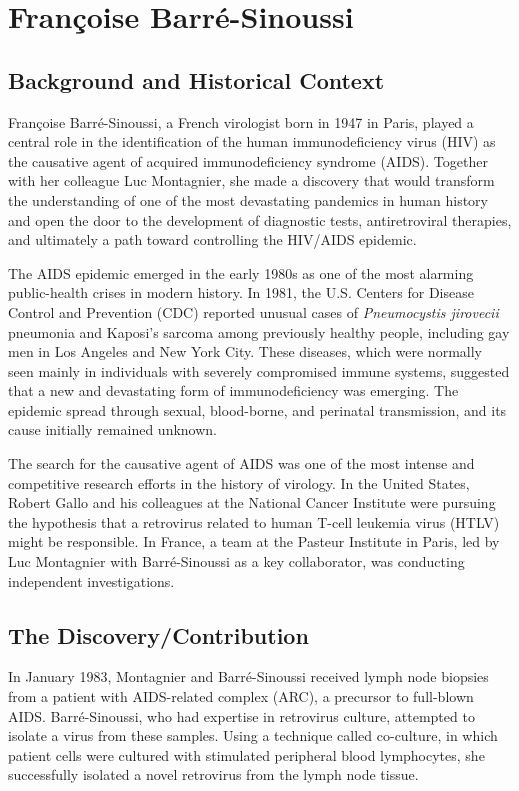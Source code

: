 \section{Fran\c{c}oise Barr\'e-Sinoussi}

\subsection{Background and Historical Context}

Fran\c{c}oise Barr\'e-Sinoussi, a French virologist born in 1947 in Paris, played a central role in the identification of the human immunodeficiency virus (HIV) as the causative agent of acquired immunodeficiency syndrome (AIDS). Together with her colleague Luc Montagnier, she made a discovery that would transform the understanding of one of the most devastating pandemics in human history and open the door to the development of diagnostic tests, antiretroviral therapies, and ultimately a path toward controlling the HIV/AIDS epidemic.

The AIDS epidemic emerged in the early 1980s as one of the most alarming public-health crises in modern history. In 1981, the U.S. Centers for Disease Control and Prevention (CDC) reported unusual cases of \textit{Pneumocystis jirovecii} pneumonia and Kaposi's sarcoma among previously healthy people, including gay men in Los Angeles and New York City. These diseases, which were normally seen mainly in individuals with severely compromised immune systems, suggested that a new and devastating form of immunodeficiency was emerging. The epidemic spread through sexual, blood-borne, and perinatal transmission, and its cause initially remained unknown.

The search for the causative agent of AIDS was one of the most intense and competitive research efforts in the history of virology. In the United States, Robert Gallo and his colleagues at the National Cancer Institute were pursuing the hypothesis that a retrovirus related to human T-cell leukemia virus (HTLV) might be responsible. In France, a team at the Pasteur Institute in Paris, led by Luc Montagnier with Barr\'e-Sinoussi as a key collaborator, was conducting independent investigations.

\subsection{The Discovery/Contribution}

In January 1983, Montagnier and Barr\'e-Sinoussi received lymph node biopsies from a patient with AIDS-related complex (ARC), a precursor to full-blown AIDS. Barr\'e-Sinoussi, who had expertise in retrovirus culture, attempted to isolate a virus from these samples. Using a technique called co-culture, in which patient cells were cultured with stimulated peripheral blood lymphocytes, she successfully isolated a novel retrovirus from the lymph node tissue.

